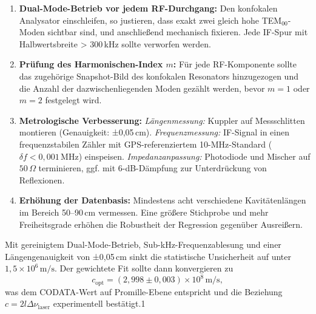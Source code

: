 \begin{enumerate}
  \item \textbf{Dual-Mode-Betrieb vor jedem RF-Durchgang:}  
    Den konfokalen Analysator einschleifen, so justieren, dass exakt zwei gleich hohe TEM\(_{00}\)-Moden sichtbar sind, und anschließend mechanisch fixieren. 
    Jede IF-Spur mit Halbwertsbreite > 300\,kHz sollte verworfen werden.

  \item \textbf{Prüfung des Harmonischen-Index \(m\):}  
    Für jede RF-Komponente sollte das zugehörige Snapshot-Bild des konfokalen Resonators hinzugezogen und die Anzahl der dazwischenliegenden Moden gezählt werden, bevor \(m = 1\) oder \(m = 2\) festgelegt wird.

  \item \textbf{Metrologische Verbesserung:}  
    \emph{Längenmessung:} Kuppler auf Messschlitten montieren (Genauigkeit: ±0{,}05\,cm).  
    \emph{Frequenzmessung:} IF-Signal in einen frequenzstabilen Zähler mit GPS-referenziertem 10-MHz-Standard (\(\delta f < 0{,}001\,\mathrm{MHz}\)) einspeisen.  
    \emph{Impedanzanpassung:} Photodiode und Mischer auf \(50\,\Omega\) terminieren, ggf. mit 6-dB-Dämpfung zur Unterdrückung von Reflexionen.

  \item \textbf{Erhöhung der Datenbasis:}  
    Mindestens acht verschiedene Kavitätenlängen im Bereich 50–90\,cm vermessen. Eine größere Stichprobe und mehr Freiheitsgrade erhöhen die Robustheit der Regression gegenüber Ausreißern.
\end{enumerate}

Mit gereinigtem Dual-Mode-Betrieb, Sub-kHz-Frequenzablesung und einer Längengenauigkeit von ±0{,}05\,cm sinkt die statistische Unsicherheit auf unter \(1{,}5\times10^6\,\mathrm{m/s}\). 
Der gewichtete Fit sollte dann konvergieren zu  
\[
  c_{\mathrm{opt}} = (2{,}998 \pm 0{,}003)\times10^{8}\,\mathrm{m/s},
\] 
was dem CODATA-Wert auf Promille-Ebene entspricht und die Beziehung \(c = 2l\Delta\nu_{\mathrm{laser}}\) experimentell bestätigt.1
